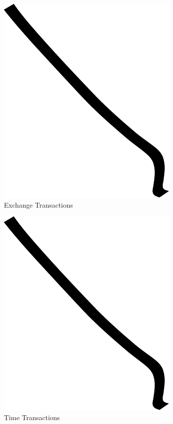 \begin{figure}
\centering
\includegraphics{img/example.pdf}
\caption{Exchange Transactions}
\end{figure}

\begin{figure}
\centering
\includegraphics{img/example.pdf}
\caption{Time Transactions}
\end{figure}


